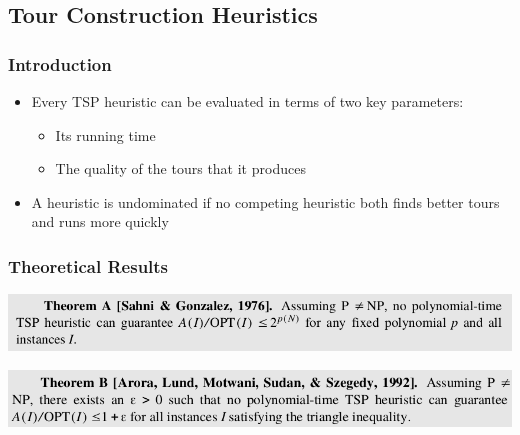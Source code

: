 \documentclass[11pt]{article}
\begin{document}
\subsection{Tour Construction Heuristics}
\label{sec:orgd3a219e}
\subsubsection{Introduction}
\label{sec:orge672907}
\begin{itemize}
\item Every TSP heuristic can be evaluated in terms of two key parameters:
\begin{itemize}
\item Its running time
\item The quality of the tours that it produces
\end{itemize}

\item A heuristic is undominated if no competing heuristic both finds better tours and runs more quickly
\end{itemize}

\subsubsection{Theoretical Results}
\label{sec:orgd076164}
\begin{center}
\includegraphics[width=.9\linewidth]{TSP Problem (local optimization)/screenshot_2019-05-05_13-05-28.png}
\end{center}

\begin{center}
\includegraphics[width=.9\linewidth]{TSP Problem (local optimization)/screenshot_2019-05-05_13-07-47.png}
\end{center}
\end{document}
